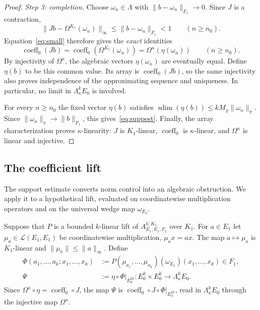 \documentclass[11pt]{amsart}
\theoremstyle{definition}
\theoremstyle{remark}
\numberwithin{equation}{section}
\newcommand{\cL}{\mathcal L}
\newcommand{\norm}[1]{\lVert #1\rVert}
\newcommand{\coeff}{\operatorname{coeff}}
\newcommand{\sdim}{\operatorname{sdim}}
\theoremstyle{plain}
\theoremstyle{definition}
\theoremstyle{plain}
\begin{document}
\begin{proof}
\emph{Step 3: completion.} Choose $\omega_n\in\Lambda$ with $\norm{b-\omega_n}_{F_1}\to0$. Since $J$ is a contraction,
\[
\norm{Jb-\Omega^{K_1}(\omega_n)}_\infty\le\norm{b-\omega_n}_{F_1}<1
\qquad(n\ge n_0).
\]
Equation~\eqref{eq:small} therefore gives the \emph{exact} identities
\[
\coeff_0(Jb)=\coeff_0(\Omega^{K_1}(\omega_n))=\Omega^\kappa(\eta(\omega_n))
\qquad(n\ge n_0).
\]
By injectivity of $\Omega^\kappa$, the algebraic vectors $\eta(\omega_n)$ are eventually equal. Define $\eta(b)$
to be this common value. Its array is $\coeff_0(Jb)$, so the same injectivity also proves independence of the
approximating sequence and uniqueness. In particular, no limit in $\Lambda^k_\kappa E_0$ is involved.

For every $n\ge n_0$ the fixed vector $\eta(b)$ satisfies
$\sdim(\eta(b))\le kM_\varrho\norm{\omega_n}_\pi$. Since $\norm{\omega_n}_\pi\to\norm b_{F_1}$, this gives~\eqref{eq:suppest}.
Finally, the array characterization proves $\kappa$\nobreakdash-linearity: $J$ is $K_1$\nobreakdash-linear, $\coeff_0$ is
$\kappa$\nobreakdash-linear, and $\Omega^\kappa$ is linear and injective.
\end{proof}

\subsection{The coefficient lift}\label{ssec:Psi}
The support estimate converts norm control into an algebraic obstruction. We apply it to a hypothetical lift,
evaluated on coordinatewise multiplication operators and on the universal wedge map $\omega_{E_1}$.

Suppose that $P$ is a bounded $k$\nobreakdash-linear lift of $A^{k,K_1}_{E_1,E_1;F_1}$ over $K_1$. For $a\in E_1$ let
$\mu_a\in\cL(E_1,E_1)$ be coordinatewise multiplication, $\mu_ax=ax$. The map $a\mapsto \mu_a$ is $K_1$\nobreakdash-linear and
$\norm{\mu_a}\le\norm a_\infty$. Define
\begin{align*}
\Phi(a_1,\dots,a_k;x_1,\dots,x_k)&:=P(\mu_{a_1},\dots,\mu_{a_k})(\omega_{E_1})(x_1,\dots,x_k)\in F_1,\\
\Psi&:=\eta\circ\Phi|_{E_0^{2k}}\colon E_0^k\times E_0^k\to\Lambda^k_\kappa E_0 .
\end{align*}
Since $\Omega^\kappa\circ\eta=\coeff_0\circ J$, the map $\Psi$ is $\coeff_0\circ J\circ\Phi|_{E_0^{2k}}$, read in $\Lambda^k_\kappa E_0$
through the injective map $\Omega^\kappa$.
\end{document}
